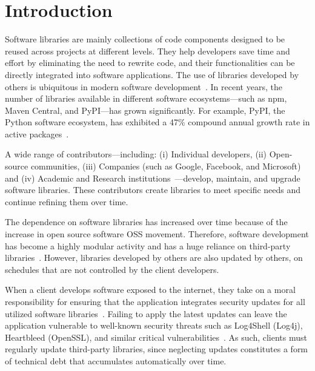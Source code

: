 \chapter{Introduction}\label{intro}
Software libraries are mainly collections of code components designed to be reused
across projects at different levels. They help developers save time and effort by
eliminating the need to rewrite code, and their functionalities can be directly integrated
into software applications.
The use of libraries developed by others is ubiquitous in modern
software development~\cite{huang22:_charac_java,wang20:_java}.
In recent years, the number of libraries available in different software ecosystems—such
as npm, Maven Central, and PyPI—has grown significantly. For example, PyPI, the Python
software ecosystem, has exhibited a 47\% compound annual growth rate in active packages~\cite{Bommarito2019}.

A wide range of contributors—including: (i) Individual developers, (ii) Open-source communities, (iii) Companies
(such as Google, Facebook, and Microsoft) and (iv) Academic and Research
institutions~\cite{Lakhani2000OSS}—develop, maintain, and upgrade software libraries.
These contributors create libraries to meet specific needs and continue refining them over time.

The dependence on software libraries has increased over time because of the increase in open source software
{OSS} movement. Therefore, software development has become a
highly modular activity and has a huge reliance on third-party libraries~\cite{decan2019empirical, zerouali2019formal, cox2019surviving}.
However, libraries developed by others are also updated by others, on schedules that are not controlled by
the client developers.


When a client develops software exposed to the internet, they take on a moral responsibility for ensuring that the
application integrates security updates for all utilized software libraries~\cite{wu23:_under_threat_upstr_vulner_downs}.
Failing to apply the latest updates can leave the application vulnerable to well-known security threats
such as Log4Shell (Log4j), Heartbleed (OpenSSL), and similar critical vulnerabilities~\cite{haryono22:_autom_ident_librar_vulner_data,zhan21:_atvhun,alfadel23:_empir_python}.
As such, clients must regularly update third-party libraries, since neglecting updates constitutes a
form of technical debt that accumulates automatically over time.



